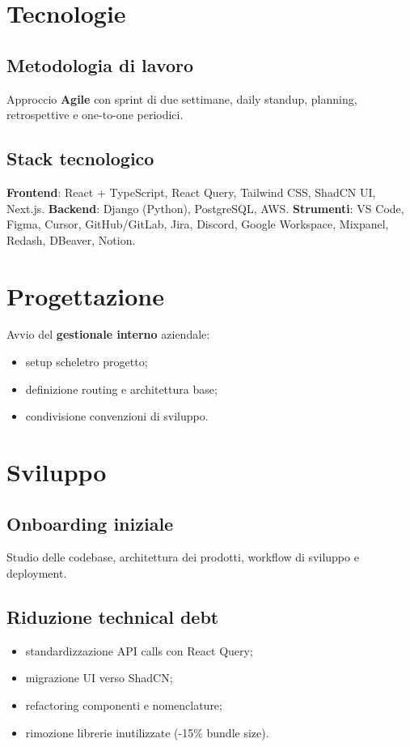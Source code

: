 \documentclass[12pt,a4paper,openright,twoside]{book}
\begin{document}
\chapter{Tecnologie}
\section{Metodologia di lavoro}
Approccio \textbf{Agile} con sprint di due settimane, daily standup, planning, retrospettive e one-to-one periodici.  

\section{Stack tecnologico}
\textbf{Frontend}: React + TypeScript, React Query, Tailwind CSS, ShadCN UI, Next.js.  
\textbf{Backend}: Django (Python), PostgreSQL, AWS.  
\textbf{Strumenti}: VS Code, Figma, Cursor, GitHub/GitLab, Jira, Discord, Google Workspace, Mixpanel, Redash, DBeaver, Notion.

\chapter{Progettazione}
Avvio del \textbf{gestionale interno} aziendale:
\begin{itemize}
  \item setup scheletro progetto;
  \item definizione routing e architettura base;
  \item condivisione convenzioni di sviluppo.
\end{itemize}

\chapter{Sviluppo}
\section{Onboarding iniziale}
Studio delle codebase, architettura dei prodotti, workflow di sviluppo e deployment.

\section{Riduzione technical debt}
\begin{itemize}
  \item standardizzazione API calls con React Query;
  \item migrazione UI verso ShadCN;
  \item refactoring componenti e nomenclature;
  \item rimozione librerie inutilizzate (-15\% bundle size).
\end{itemize}
\end{document}
